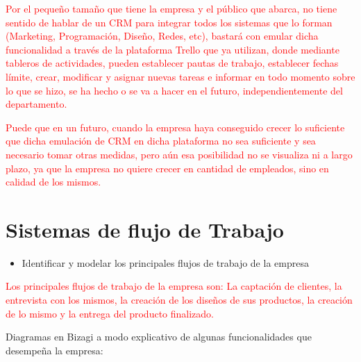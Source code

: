 \documentclass{article}
\begin{document}
\textcolor{Red}{Por el pequeño tamaño que tiene la empresa y el público que abarca, no tiene sentido de hablar de un CRM para integrar todos los sistemas que lo forman (Marketing, Programación, Diseño, Redes, etc), bastará con emular dicha funcionalidad a través de la plataforma Trello que ya utilizan, donde mediante tableros de actividades, pueden establecer pautas de trabajo, establecer fechas límite, crear, modificar y asignar nuevas tareas e informar en todo momento sobre lo que se hizo, se ha hecho o se va a hacer en el futuro, independientemente del departamento.}

\textcolor{Red}{Puede que en un futuro, cuando la empresa haya conseguido crecer lo suficiente que dicha emulación de CRM en dicha plataforma no sea suficiente y sea necesario tomar otras medidas, pero aún esa posibilidad no se visualiza ni a largo plazo, ya que la empresa no quiere crecer en cantidad de empleados, sino en calidad de los mismos.}

\section{Sistemas de flujo de Trabajo}

\begin{itemize}
\item Identificar y modelar los principales flujos de trabajo de la empresa
\end{itemize}
\textcolor{Red}{Los principales flujos de trabajo de la empresa son: La captación de clientes, la entrevista con los mismos, la creación de los diseños de sus productos, la creación de lo mismo y la entrega del producto finalizado.}

Diagramas en Bizagi a modo explicativo de algunas funcionalidades que desempeña la empresa: 
\end{document}
